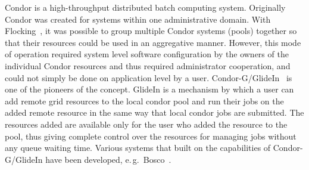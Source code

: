 \documentclass{sig-alternate}
\begin{document}
Condor is a high-throughput distributed batch computing system.
Originally Condor was created for systems within one administrative domain.
With Flocking~\cite{Epema:1996:flocking}, it was possible to group multiple
Condor systems (pools) together so that their resources could be used in an
aggregative manner.
However, this mode of operation required system level software configuration by
the owners of the individual Condor resources and thus required administrator
cooperation, and could not simply be done on application level by a user.
Condor-G/GlideIn~\cite{condor-g} is one of the pioneers of the \pilotjob
concept.
GlideIn is a mechanism by which a user can add remote grid resources to the
local condor pool and run their jobs on the added remote resource in the same
way that local condor jobs are submitted.
The resources added are available only for the user who added the resource to
the pool, thus giving complete control over the resources for managing jobs
without any queue waiting time.
Various systems that built on the \pilot capabilities of Condor-G/GlideIn have
been developed, e.\,g.\ Bosco~\cite{bosco}.


\end{document}
